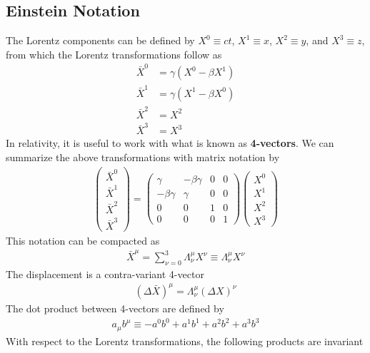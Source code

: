 \begin{multicols}{2}
\subsection{Einstein Notation}
The Lorentz components can be defined by $X^0\equiv ct$, $X^1\equiv x$, $X^2\equiv y$, and $X^3\equiv z$, from which the Lorentz transformations follow as
\begin{align}
	\bar{X}^0  &= \gamma (X^0-\beta X^1) \\
	\bar{X}^1  &= \gamma (X^1-\beta X^0) \\
	\bar{X}^2  &= X^2 \\
	\bar{X}^3  &= X^3
\end{align}
In relativity, it is useful to work with what is known as \textbf{4-vectors}. We can summarize the above transformations with matrix notation by
\begin{align}
	\begin{pmatrix}
		\bar{X}^0 \\\bar{X}^1\\\bar{X}^2\\\bar{X}^3
	\end{pmatrix} = 
	\begin{pmatrix}
		\gamma & -\beta \gamma & 0 & 0 \\
		-\beta \gamma & \gamma & 0 & 0 \\
		0 & 0 & 1 & 0 \\
		0 & 0 & 0 & 1
	\end{pmatrix}
	\begin{pmatrix}
	X^0 \\ X^1 \\ X^2 \\ X^3
\end{pmatrix}
\end{align}
This notation can be compacted as
\begin{align}
	\bar{X}^\mu = \sum_{\nu=0}^{3}\Lambda_\nu^\mu X^\nu \equiv \Lambda_\nu^\mu X^\nu
\end{align}
The displacement is a contra-variant 4-vector
\begin{align}
	(\Delta\bar{X})^\mu = \Lambda_\nu^\mu (\Delta X)^\nu
\end{align} 
The dot product between 4-vectors are defined by
\begin{align}
	a_\mu b^\mu \equiv -a^0b^0+a^1b^1+a^2b^2+a^3b^3
\end{align}
With respect to the Lorentz transformations, the following products are invariant
\begin{align}

\end{align}
\end{multicols}
